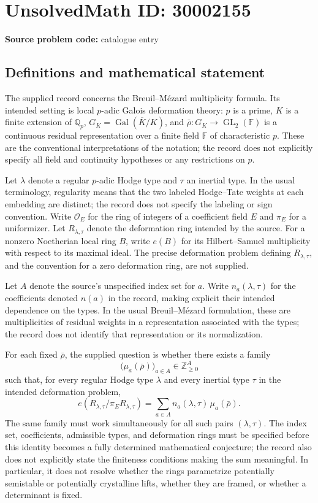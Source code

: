 \documentclass[11pt]{article}
\newcommand{\Z}{\mathbb{Z}}
\newcommand{\Q}{\mathbb{Q}}
\begin{document}
\section*{UnsolvedMath ID: 30002155}
\textbf{Source problem code:} catalogue entry
\subsection{Definitions and mathematical statement}
The supplied record concerns the Breuil--M\'ezard multiplicity formula. Its intended setting is local $p$-adic Galois deformation theory: $p$ is a prime, $K$ is a finite extension of $\Q_p$, $G_K=\operatorname{Gal}(\overline K/K)$, and $\bar\rho:G_K\to\operatorname{GL}_2(\mathbb F)$ is a continuous residual representation over a finite field $\mathbb F$ of characteristic $p$. These are the conventional interpretations of the notation; the record does not explicitly specify all field and continuity hypotheses or any restrictions on $p$.

Let $\lambda$ denote a regular $p$-adic Hodge type and $\tau$ an inertial type. In the usual terminology, regularity means that the two labeled Hodge--Tate weights at each embedding are distinct; the record does not specify the labeling or sign convention. Write $\mathcal O_E$ for the ring of integers of a coefficient field $E$ and $\pi_E$ for a uniformizer. Let $R_{\lambda,\tau}$ denote the deformation ring intended by the source. For a nonzero Noetherian local ring $B$, write $e(B)$ for its Hilbert--Samuel multiplicity with respect to its maximal ideal. The precise deformation problem defining $R_{\lambda,\tau}$, and the convention for a zero deformation ring, are not supplied.

Let $A$ denote the source's unspecified index set for $a$. Write $n_a(\lambda,\tau)$ for the coefficients denoted $n(a)$ in the record, making explicit their intended dependence on the types. In the usual Breuil--M\'ezard formulation, these are multiplicities of residual weights in a representation associated with the types; the record does not identify that representation or its normalization.

For each fixed $\bar\rho$, the supplied question is whether there exists a family
\[
  \bigl(\mu_a(\bar\rho)\bigr)_{a\in A}\in\Z_{\geq 0}^{A}
\]
such that, for every regular Hodge type $\lambda$ and every inertial type $\tau$ in the intended deformation problem,
\[
 e\!\left(R_{\lambda,\tau}/\pi_E R_{\lambda,\tau}\right)
   =\sum_{a\in A}n_a(\lambda,\tau)\,\mu_a(\bar\rho).
\]
The same family must work simultaneously for all such pairs $(\lambda,\tau)$. The index set, coefficients, admissible types, and deformation rings must be specified before this identity becomes a fully determined mathematical conjecture; the record also does not explicitly state the finiteness conditions making the sum meaningful. In particular, it does not resolve whether the rings parametrize potentially semistable or potentially crystalline lifts, whether they are framed, or whether a determinant is fixed.
\end{document}
